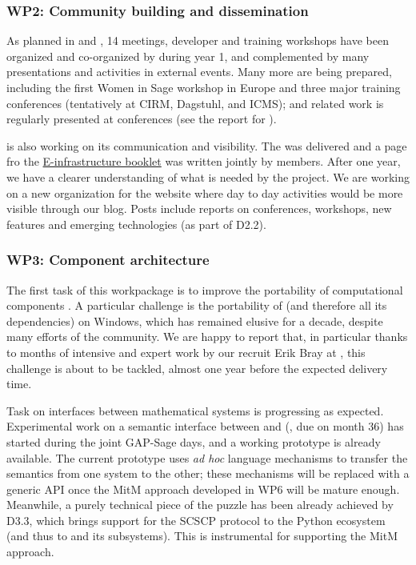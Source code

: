 \documentclass{deliverablereport}
\begin{document}
\subsubsection{WP2: Community building and dissemination}

As planned in  and
, 14 meetings, developer and training
workshops have been organized and co-organized by \ODK during year 1,
and complemented by many presentations and activities in external events.
Many more are being prepared, including the first Women in Sage
workshop in Europe and three major training conferences (tentatively
at CIRM, Dagstuhl, and ICMS); \ODK and \ODK related work is regularly
presented at conferences (see the report for
).

\ODK is also working on its communication and visibility. The 
 was delivered and a page fro the \href{https://github.com/OpenDreamKit/OpenDreamKit/blob/master/Communication/eInfra-Booklet/ODK.md}{E-infrastructure booklet} was written
jointly by \ODK members. After
one year, we have a clearer understanding of what is needed by the project.
We are working on a new organization for the website where day to day activities
would be more visible through our blog. Posts include reports on conferences, workshops,
new features and emerging technologies (as part of D2.2).


\subsubsection{WP3: Component architecture}

The first task of this workpackage is to improve the portability of
computational components
. A particular challenge
is the portability of \Sage (and therefore all its dependencies)
on Windows, which has remained elusive for a decade, despite many
efforts of the community. We are happy to report that, in particular
thanks to months of intensive and expert work by our recruit Erik Bray at 
, this challenge is about to be tackled, almost one year
before the expected delivery time.

Task  on interfaces
between mathematical systems is progressing as expected. Experimental
work on a semantic interface between \GAP and \Sage
(, due
on month 36) has started during the joint GAP-Sage days, and a working
prototype is already available. The current prototype uses \emph{ad
  hoc} language mechanisms to transfer the semantics from one system
to the other; these mechanisms will be replaced with a generic API
once the MitM approach developed in WP6 will be mature
enough. Meanwhile, a purely technical piece of the puzzle has been
already achieved by D3.3, which brings support for the SCSCP protocol
to the Python ecosystem (and thus to \Sage and its subsystems). This
is instrumental for supporting the MitM approach.
\end{document}
